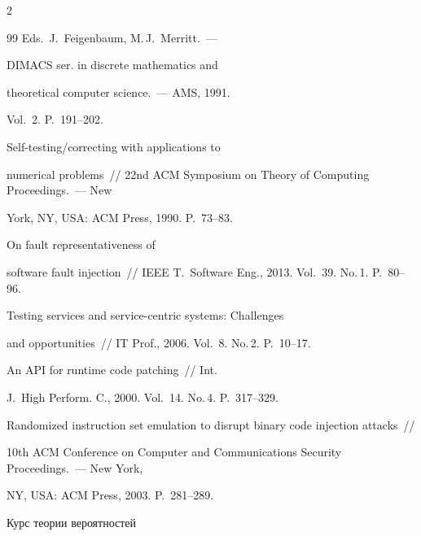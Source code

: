 \begin{multicols}{2}
{{\begin{thebibliography}{99}
      Eds.\ J.~Feigenbaum, M.\,J.~Merritt.~---


      DIMACS ser. in discrete mathematics and 


theoretical computer science.~--- AMS, 1991. 


  Vol.~2. P.~191--202.




      Self-testing/correcting with applications to 


numerical problems~// 22nd ACM Symposium on Theory of Computing Proceedings.~--- New 


York, NY, USA: ACM Press, 1990. P.~73--83.


     




      On fault representativeness of 


software fault injection~// IEEE T.~Software Eng., 2013. Vol.~39. No.\,1. P.~80--96.




      Testing services and service-centric systems: Challenges 


and opportunities~// IT Prof., 2006. Vol.~8. No.\,2. P.~10--17.







      An API for runtime code patching~// Int. 


J.~High Perform. C., 2000. Vol.~14. No.\,4. P.~317--329.




      Randomized instruction set emulation to disrupt binary code injection attacks~// 


10th ACM Conference on Computer and Communications Security Proceedings.~--- New York, 


NY, USA: ACM Press, 2003. P.~281--289.







      Курс теории вероятностей 



\end{thebibliography}}}
\end{multicols}

